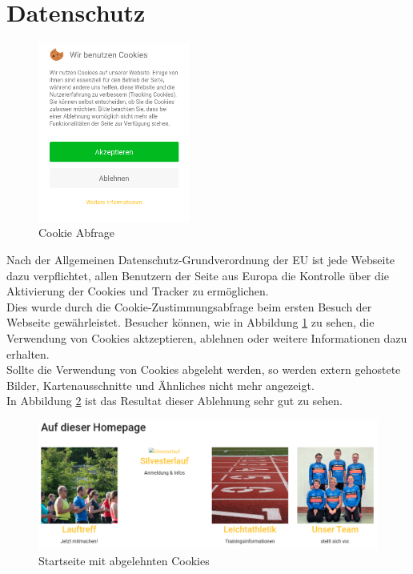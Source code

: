 \documentclass[12pt,a4paper]{article}
\begin{document}
\section{Datenschutz}
\begin{figure}
  \includegraphics[width=5cm]{Cookies.png}
  \caption{Cookie Abfrage}
  \label{img:Cookie}
\end{figure}
Nach der Allgemeinen Datenschutz-Grundverordnung der EU ist jede Webseite dazu verpflichtet, allen Benutzern der Seite aus Europa die Kontrolle über die Aktivierung der Cookies und Tracker zu ermöglichen.\\
Dies wurde durch die Cookie-Zustimmungsabfrage beim ersten Besuch der Webseite gewährleistet. Besucher können, wie in Abbildung \ref{img:Cookie} zu sehen, die Verwendung von Cookies aktzeptieren, ablehnen oder weitere Informationen dazu erhalten.\\
Sollte die Verwendung von Cookies abgeleht werden, so werden extern gehostete Bilder, Kartenausschnitte und Ähnliches nicht mehr angezeigt.\\
In Abbildung \ref{img:CookiesAbgelehnt} ist das Resultat dieser Ablehnung sehr gut zu sehen.\\
\begin{figure}[htbp]
  \includegraphics[width=\textwidth]{CookiesAbgelehnt.png}
  \caption{Startseite mit abgelehnten Cookies}
  \label{img:CookiesAbgelehnt}
\end{figure}
\end{document}
